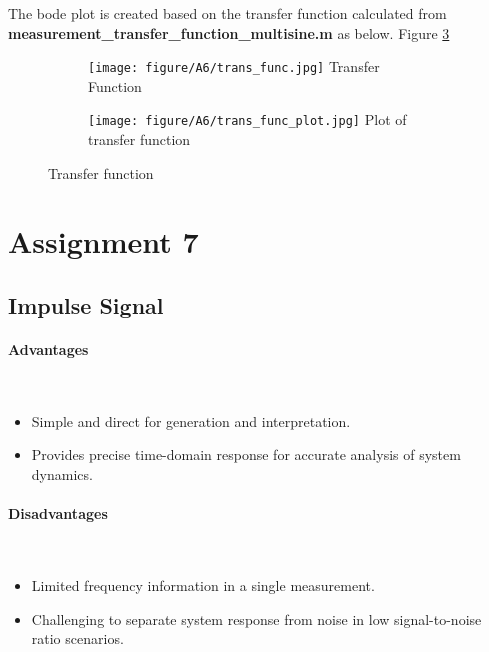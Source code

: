 \documentclass[
	a4paper,
	11pt,
]{article}
\begin{document}
The bode plot is created based on the transfer function calculated from  \textbf{measurement\_transfer\_function\_multisine\mbox{.}m} as below. Figure \ref{fig:a6_last_fig}

\begin{figure}[h]
    \centering
    \begin{subfigure}[b]{0.43\textwidth}
        \centering
        \texttt{[image: figure/A6/trans\_func.jpg]}
        \label{fig:RC_schema}
        {{\small  Transfer Function}}  
    \end{subfigure}
    \hfill
    \begin{subfigure}[b]{0.43\textwidth}
        \centering
        \texttt{[image: figure/A6/trans\_func\_plot.jpg]}
        \label{fig:RC_breadboard}
        {{\small Plot of transfer function}}   
    \end{subfigure}
    \caption{Transfer function}
    \label{fig:a6_last_fig}
\end{figure}

\section{Assignment 7}

\subsection{Impulse Signal}

\paragraph{Advantages}\mbox{}\\

\begin{itemize}
    \item Simple and direct for generation and interpretation.
    \item Provides precise time-domain response for accurate analysis of system dynamics.
\end{itemize}

\paragraph{Disadvantages}\mbox{}\\

\begin{itemize}
    \item Limited frequency information in a single measurement.
    \item Challenging to separate system response from noise in low signal-to-noise ratio scenarios.
\end{itemize}
\end{document}
